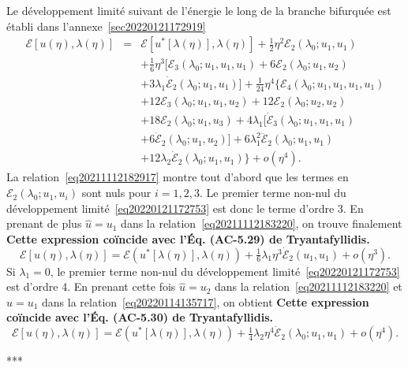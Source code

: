 \documentclass[12pt, final]{amsart}
\begin{document}
Le d{\'e}veloppement limit{\'e} suivant de l'{\'e}nergie le long de la branche
bifurqu{\'e}e est {\'e}tabli dans l'annexe~\ref{sec20220121172919}
\begin{eqnarray}
  \mathcal{E} [u (\eta), \lambda (\eta)] & = & \mathcal{E} [u^{\ast} [\lambda
  (\eta)], \lambda (\eta)] + \tfrac{1}{2} \eta^2 \mathcal{E}_2 (\lambda_0 ;
  u_1, u_1) \nonumber\\
  &  & + \tfrac{1}{6} \eta^3  [\mathcal{E}_3 (\lambda_0 ; u_1, u_1, u_1) +
  6\mathcal{E}_2 (\lambda_0 ; u_1, u_2)  \nonumber\\
  &  &  + 3 \lambda_1  \dot{\mathcal{E}}_2 (\lambda_0 ; u_1, u_1)]
  + \tfrac{1}{24} \eta^4  \{ \mathcal{E}_4 (\lambda_0 ; u_1, u_1, u_1, u_1)
   \nonumber\\
  &  & + 12\mathcal{E}_3 (\lambda_0 ; u_1, u_1, u_2) + 12\mathcal{E}_2
  (\lambda_0 ; u_2, u_2) \nonumber\\
  &  & + 18\mathcal{E}_2 (\lambda_0 ; u_1, u_3) + 4 \lambda_1
  [\dot{\mathcal{E}}_3 (\lambda_0 ; u_1, u_1, u_1)  \nonumber\\
  &  &  + 6 \dot{\mathcal{E}}_2 (\lambda_0 ; u_1, u_2)] + 6
  \lambda_1^2  \ddot{\mathcal{E}}_2 (\lambda_0 ; u_1, u_1) \nonumber\\
  &  &  + 12 \lambda_2  \dot{\mathcal{E}}_2 (\lambda_0 ; u_1, u_1)
  \} + o (\eta^4) .  \label{eq20220121172753}
\end{eqnarray}
La relation~\eqref{eq20211112182917} montre tout d'abord que les termes en
$\mathcal{E}_2 (\lambda_0 ; u_1, u_i)$ sont nuls pour $i = 1, 2, 3$. Le
premier terme non-nul du d{\'e}veloppement limit{\'e}~\eqref{eq20220121172753}
est donc le terme d'ordre 3. En prenant de plus $\hat{u} = u_1$ dans la
relation~\eqref{eq20211112183220}, on trouve finalement \textbf{Cette
expression co{\"i}ncide avec l'{\'E}q. (AC-5.29) de Tryantafyllidis.}
\begin{equation}
  \mathcal{E} [u (\eta), \lambda (\eta)] =\mathcal{E} (u^{\ast} [\lambda
  (\eta)], \lambda (\eta)) + \tfrac{1}{6} \lambda_1 \eta^3
  \dot{\mathcal{E}}_2 (u_1, u_1) + o (\eta^3) .
\end{equation}
Si $\lambda_1 = 0$, le premier terme non-nul du d{\'e}veloppement
limit{\'e}~\eqref{eq20220121172753} est d'ordre 4. En prenant cette fois
$\hat{u} = u_2$ dans la relation~\eqref{eq20211112183220} et $\hat{u} = u_1$
dans la relation~\eqref{eq20220114135717}, on obtient \textbf{Cette
expression co{\"i}ncide avec l'{\'E}q. (AC-5.30) de Tryantafyllidis.}
\begin{equation}
  \mathcal{E} [u (\eta), \lambda (\eta)] =\mathcal{E} (u^{\ast} [\lambda
  (\eta)], \lambda (\eta)) + \tfrac{1}{4} \lambda_2 \eta^4
  \dot{\mathcal{E}}_2 (\lambda_0 ; u_1, u_1) + o (\eta^4) .
\end{equation}
\begin{center}
  ***
\end{center}
\end{document}
